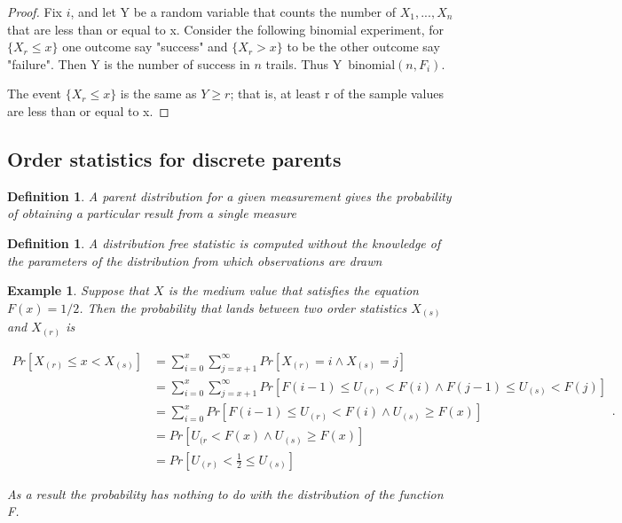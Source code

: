 \documentclass[11pt,a4paper]{article}
\theoremstyle{plain}
\newtheorem{de}[fact]{Definition}
\newtheorem{exmp}[fact]{Example}
\begin{document}
\begin{proof}
Fix $i$, and let Y be a random variable that counts the number of $X_1,...,X_n$ that are less than or equal to x. Consider the following binomial experiment, for $\{X_r \leq x\}$ one outcome say "success" and $\{X_r>x\}$ to be the other outcome say "failure". Then Y is the number of success in $n$ trails. Thus Y~binomial$(n,F_i).$

The event $\{X_r \leq x\}$ is the same as ${Y\geq r}$; that is, at least r of the sample values are less than or equal to x.
\end{proof}

 \newpage
 \subsection*{Order statistics for discrete parents}
 \begin{de}
 A parent distribution for a given measurement gives the probability of obtaining a particular result from a single measure
 \end{de}
 
 \begin{de}
 A distribution free statistic is computed without the knowledge of the parameters of the distribution from which observations are drawn
 \end{de}
 
 \begin{exmp}
Suppose that $X$ is the medium value that satisfies the equation $F(x)=1/2$. Then the probability that lands between two order statistics $X_{(s)}$ and $X_{(r)}$ is
\begin{center}
\[
     \begin{array}{ll}
Pr[X_{(r)}\leq x < X_{(s)}]&=\sum_{i=0}^x \sum_{j=x+1}^\infty Pr[X_{(r)}=i \wedge X_{(s)}=j]\\
&=\sum_{i=0}^x \sum_{j=x+1}^\infty Pr[F(i-1)\leq U_{(r)}<F(i)\wedge F(j-1)\leq U_{(s)}<F(j)]\\
&=\sum_{i=0}^x  Pr[F(i-1)\leq U_{(r)}<F(i)\wedge U_{(s)}\geq F(x)]\\
&=Pr[U_{(r}<F(x)\wedge U_{(s)} \geq F(x)]\\
&=Pr[U_{(r)}<\frac{1}{2}\leq U_{(s)}]
            \end{array}       .
  \]
\end{center}
As a result the probability has nothing to do with the distribution of the function F.
 \end{exmp}
 
\end{document}
